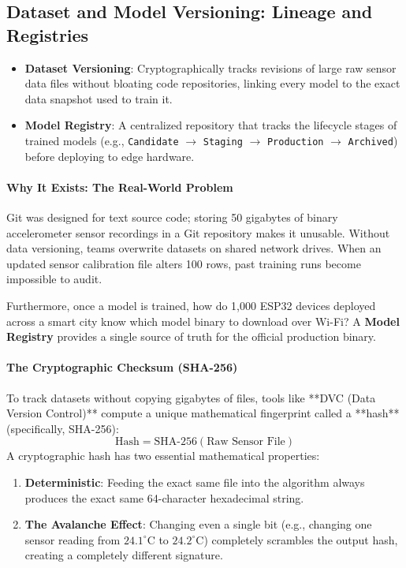 \subsection{Dataset and Model Versioning: Lineage and Registries}

\begin{keyidea}
\begin{itemize}
    \item \textbf{Dataset Versioning}: Cryptographically tracks revisions of large raw sensor data files without bloating code repositories, linking every model to the exact data snapshot used to train it.
    \item \textbf{Model Registry}: A centralized repository that tracks the lifecycle stages of trained models (e.g., \texttt{Candidate} $\to$ \texttt{Staging} $\to$ \texttt{Production} $\to$ \texttt{Archived}) before deploying to edge hardware.
\end{itemize}
\end{keyidea}

\paragraph{Why It Exists: The Real-World Problem}
Git was designed for text source code; storing 50 gigabytes of binary accelerometer sensor recordings in a Git repository makes it unusable. Without data versioning, teams overwrite datasets on shared network drives. When an updated sensor calibration file alters 100 rows, past training runs become impossible to audit. 

Furthermore, once a model is trained, how do 1,000 ESP32 devices deployed across a smart city know which model binary to download over Wi-Fi? A \textbf{Model Registry} provides a single source of truth for the official production binary.

\paragraph{The Cryptographic Checksum (SHA-256)}
To track datasets without copying gigabytes of files, tools like **DVC (Data Version Control)** compute a unique mathematical fingerprint called a **hash** (specifically, SHA-256):
\begin{equation}
\text{Hash} = \text{SHA-256}(\text{Raw Sensor File})\label{eq:sha256}
\end{equation}
A cryptographic hash has two essential mathematical properties:
\begin{enumerate}
    \item \textbf{Deterministic}: Feeding the exact same file into the algorithm always produces the exact same 64-character hexadecimal string.
    \item \textbf{The Avalanche Effect}: Changing even a single bit (e.g., changing one sensor reading from $24.1^\circ\text{C}$ to $24.2^\circ\text{C}$) completely scrambles the output hash, creating a completely different signature.
\end{enumerate}

